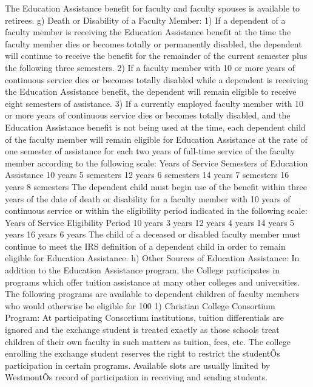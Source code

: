 \documentclass[letterpaper, 11pt]{article}
\begin{document}
   The Education Assistance benefit for faculty and faculty spouses is available to retirees.
g) Death or Disability of a Faculty Member:
1) If a dependent of a faculty member is receiving the Education Assistance benefit at the time the faculty member dies or becomes totally or permanently disabled, the dependent will continue to receive the benefit for the remainder of the current semester plus the following three semesters.
2) If a faculty member with 10 or more years of continuous service dies or becomes totally disabled while a dependent is receiving the Education Assistance benefit, the dependent will remain eligible to receive eight semesters of assistance.
3) If a currently employed faculty member with 10 or more years of continuous service dies or becomes totally disabled, and the Education Assistance benefit is not being used at the time, each dependent child of the faculty member will remain eligible for Education Assistance at the rate of one semester of assistance for each two years of full-time service of the faculty member according to the following scale:
   Years of Service			Semesters of Education Assistance
	10 years				5 semesters
	12 years				6 semesters
	14 years				7 semesters
	16 years				8 semesters
   The dependent child must begin use of the benefit within three years of the date of death or disability for a faculty member with 10 years of continuous service or within the eligibility period indicated in the following scale:
   Years of Service			Eligibility Period
	10 years				3 years
	12 years				4 years
	14 years				5 years
	16 years				6 years
   The child of a deceased or disabled faculty member must continue to meet the IRS definition of a dependent child in order to remain eligible for Education Assistance.
h) Other Sources of Education Assistance:
   In addition to the Education Assistance program, the College participates in programs which offer tuition assistance at many other colleges and universities.  The following programs are available to dependent children of faculty members who would otherwise be eligible for 100%
1) Christian College Consortium Program:  At participating Consortium institutions, tuition differentials are ignored and the exchange student is treated exactly as those schools treat children of their own faculty in such matters as tuition, fees, etc.  The college enrolling the exchange student reserves the right to restrict the studentÕs participation in certain programs.  Available slots are usually limited by WestmontÕs record of participation in receiving and sending students.
\end{document}

